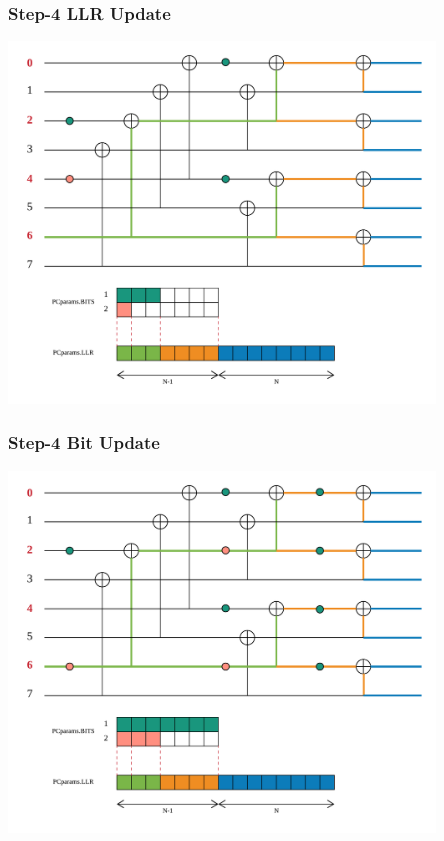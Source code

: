 \documentclass{beamer}
\begin{document}
\begin{frame}
\frametitle{Step-4 LLR Update}
  \begin{center}
  \includegraphics[width=0.85\textwidth]{pics/polar_-_SC_llr_4.png}
  \end{center}
\end{frame}

\begin{frame}
\frametitle{Step-4 Bit Update}
  \begin{center}
  \includegraphics[width=0.85\textwidth]{pics/polar_-_SC_bit_4.png}
  \end{center}
\end{frame}
\end{document}
